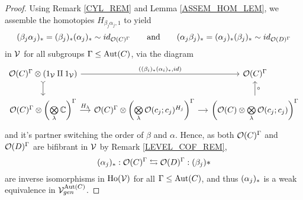 \documentclass[a4paper,10pt
,draft
]{article}%
\renewcommand{\1}{\eta}%
\begin{document}
\begin{proof}
      Using Remark \ref{CYL_REM} and Lemma \ref{ASSEM_HOM_LEM}, we assemble the homotopies $H_{\beta_j \alpha_j,1}$ to yield
      \begin{equation}
            (\beta_j \alpha_j)_{\**} = (\beta_j)_{\**} (\alpha_j)_{\**} \sim id_{\O(C)^\Gamma}
            \qquad
            \textrm{and}
            \qquad
            (\alpha_j \beta_j)_{\**} = (\alpha_j)_{\**} (\beta_j)_{\**} \sim id_{\O(D)^\Gamma}
      \end{equation}
      in $\mathcal V$ for all subgroups $\Gamma \leq \operatorname{Aut}(C)$, via the diagram
      \begin{equation}
            \begin{tikzcd}[column sep = small]
                  \O(C)^\Gamma \otimes (1_\V \amalg 1_\V) \arrow[d, tail] \arrow[rr, "{((\beta_i)_{\**}(\alpha_i)_{\**}, id)}"]
                  &&
                  \O(C)^\Gamma
                  \\                  
                  \O(C)^\Gamma \otimes \left(\bigotimes\limits_\lambda \mathbb C\right)^{\Gamma}
                  \arrow[r, "H_\lambda"]
                  &
                  \O(C)^\Gamma \otimes \left(\bigotimes\limits_\lambda \O(c_j;c_j)^{H_j}\right)^{\Gamma} \arrow[r]
                  &
                  \left( \O(C) \otimes \bigotimes\limits_\lambda \O(c_j;c_j) \right)^{\Gamma} \arrow[u, "\circ"']
            \end{tikzcd}
      \end{equation}
      and it's partner switching the order of $\beta$ and $\alpha$.      
      Hence, as both $\mathcal{O}(C)^\Gamma$ and $\mathcal{O}(D)^\Gamma$ are bifibrant in $\mathcal V$ by Remark \ref{LEVEL_COF_REM},
      \[
            (\alpha_j)_{\**}: \O(C)^\Gamma \leftrightarrows \O(D)^\Gamma : (\beta_j){\**}
      \]
      are inverse isomorphisms in $\operatorname{Ho}(\mathcal V)$ for all $\Gamma \leq \operatorname{Aut}(C)$,
      and thus $(\alpha_j)_{\**}$ is a weak equivalence in $\mathcal V^{\operatorname{Aut}(C)}_{gen}$.


\end{proof}
\end{document}
